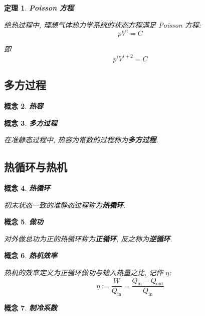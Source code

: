 \documentclass[UTF8]{ctexart}
\newcommand{\<}{\langle}
\renewcommand{\>}{\rangle}                              %
\newenvironment{dfn_box}{
    \begin{tcolorbox}[enhanced, colback=dfn_green2, boxrule=0pt, frame hidden,
        borderline west={0.7mm}{0.1mm}{dfn_green1},breakable]
    }
    {\end{tcolorbox}}
\newenvironment{thm_box}{
    \begin{tcolorbox}[enhanced, colback=thm_blue2, boxrule=0pt, frame hidden,
        borderline west={0.7mm}{0.1mm}{thm_blue1},breakable]
    }
    {\end{tcolorbox}}
\theoremstyle{MyStyle} %
\newtheorem{definition}{概念}[subsection]
\newenvironment{cpt}{\begin{dfn_box}\begin{definition}}{\end{definition}\end{dfn_box}}
\newtheorem{theorem}[definition]{定理}
\newenvironment{thm}{\begin{thm_box}\begin{theorem}}{\end{theorem}\end{thm_box}}
\begin{document}
        \begin{thm}
            \textbf{Poisson 方程}

            绝热过程中, 理想气体热力学系统的状态方程满足 Poisson 方程: 
            \[pV^{\gamma}=C\]
            
            即
            \[p^i V^{i+2}=C\]
        \end{thm}

    \subsection{多方过程}
        
        \begin{cpt}
            \textbf{热容}
        \end{cpt}
        
        \begin{cpt}
            \textbf{多方过程}

            在准静态过程中, 热容为常数的过程称为\textbf{多方过程}. 
        \end{cpt}

    \subsection{热循环与热机}
        
        \begin{cpt}
            \textbf{热循环}

            初末状态一致的准静态过程称为\textbf{热循环}. 
        \end{cpt}
        
        \begin{cpt}
            \textbf{做功}

            对外做总功为正的热循环称为\textbf{正循环}, 反之称为\textbf{逆循环}. 
        \end{cpt}
        
        \begin{cpt}
            \textbf{热机效率}

            热机的效率定义为正循环做功与输入热量之比, 记作 \(\eta\): 
            \[\eta:=\frac{W}{Q_{\text{in}}}=\frac{Q_{\text{in}}-Q_{\text{out}}}{Q_{\text{in}}}\]
        \end{cpt}
        
        \begin{cpt}
            \textbf{制冷系数}
        \end{cpt}
        
\end{document}
